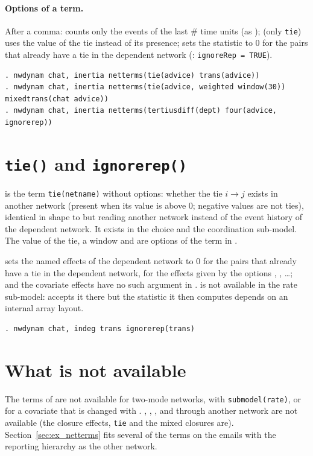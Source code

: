 \paragraph{Options of a term.} After a comma:  counts only the events of the last \# time units (as );  (only \texttt{tie}) uses the value of the tie instead of its presence;  sets the statistic to 0 for the pairs that already have a tie in the dependent network (\goldfish{}: \texttt{ignoreRep = TRUE}).
\begin{lstlisting}
. nwdynam chat, inertia netterms(tie(advice) trans(advice))
. nwdynam chat, inertia netterms(tie(advice, weighted window(30)) mixedtrans(chat advice))
. nwdynam chat, inertia netterms(tertiusdiff(dept) four(advice, ignorerep))
\end{lstlisting}

\section{\texttt{tie()} and \texttt{ignorerep()}}

 is the term \texttt{tie(netname)} without options: whether the tie $i\to j$ exists in another network (present when its value is above 0; negative values are not ties), identical in shape to  but reading another network instead of the event history of the dependent network. It exists in the choice and the coordination sub-model. The value of the tie, a window and  are options of the term in .

 sets the named effects of the dependent network to 0 for the pairs that already have a tie in the dependent network, for the effects given by the options , , \ldots;  and the covariate effects have no such argument in \goldfish{}.  is not available in the rate sub-model: \goldfish{} accepts it there but the statistic it then computes depends on an internal array layout.
\begin{lstlisting}
. nwdynam chat, indeg trans ignorerep(trans)
\end{lstlisting}

\section{What is not available}

The terms of  are not available for two-mode networks, with \texttt{submodel(rate)}, or for a covariate that is changed with . , , ,  and  through another network are not available (the closure effects, \texttt{tie} and the mixed closures are). Section~\ref{sec:ex_netterms} fits several of the terms on the emails with the reporting hierarchy as the other network.
